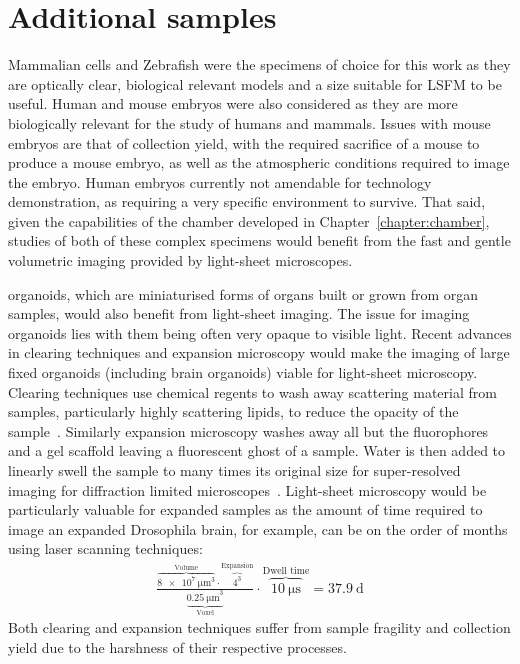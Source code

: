 \section{Additional samples}

Mammalian cells and Zebrafish were the specimens of choice for this work as they are optically clear, biological relevant models and a size suitable for \gls{LSFM} to be useful.
Human and mouse embryos were also considered as they are more biologically relevant for the study of humans and mammals.
Issues with mouse embryos are that of collection yield, with the required sacrifice of a mouse to produce a mouse embryo, as well as the atmospheric conditions required to image the embryo.
Human embryos currently not amendable for technology demonstration, as requiring a very specific environment to survive.
That said, given the capabilities of the chamber developed in Chapter~\ref{chapter:chamber}, studies of both of these complex specimens
would benefit from the fast and gentle volumetric imaging provided by light-sheet microscopes.

\gls{organoid}s, which are miniaturised forms of organs built or grown from organ samples, would also benefit from light-sheet imaging.
The issue for imaging organoids lies with them being often very opaque to visible light.
Recent advances in clearing techniques and expansion microscopy would make the imaging of large fixed organoids (including brain organoids) viable for light-sheet microscopy.
Clearing techniques use chemical regents to wash away scattering material from samples, particularly highly scattering lipids, to reduce the opacity of the sample~\cite{_clearing_2016}. %
Similarly expansion microscopy washes away all but the fluorophores and a gel scaffold leaving a fluorescent ghost of a sample.
Water is then added to linearly swell the sample to many times its original size for super-resolved imaging for diffraction limited microscopes~\cite{chen_expansion_2015}.
Light-sheet microscopy would be particularly valuable for expanded samples as the amount of time required to image an expanded Drosophila brain, for example, can be on the order of months using laser scanning techniques:
\begin{align}
  \frac{\overbrace{\SI{8e7}{\micro\meter\cubed}}^\text{Volume} \cdot \overbrace{4^3}^\text{Expansion}}{\underbrace{{\SI{0.25}{\micro\meter}}^3}_{\text{Voxel}}}\cdot \overbrace{\SI{10}{\micro\second}}^{\text{Dwell time}} = \SI{37.9}{\day}
\end{align}
Both clearing and expansion techniques suffer from sample fragility and collection yield due to the harshness of their respective processes.

